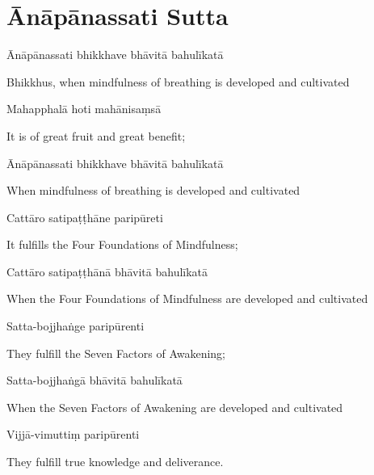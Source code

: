 \section{Ānāpānassati Sutta}


\begin{leader}
\end{leader}

Ānāpānassati bhikkhave bhāvitā bahulīkatā

\begin{english}
  Bhikkhus, when mindfulness of breathing is developed and cultivated
\end{english}

Mahapphalā hoti mahānisaṃsā

\begin{english}
  It is of great fruit and great benefit;
\end{english}

Ānāpānassati bhikkhave bhāvitā bahulīkatā

\begin{english}
  When mindfulness of breathing is developed and cultivated
\end{english}

Cattāro satipaṭṭhāne paripūreti

\begin{english}
  It fulfills the Four Foundations of Mindfulness;
\end{english}

Cattāro satipaṭṭhānā bhāvitā bahulīkatā

\begin{english}
  When the Four Foundations of Mindfulness are developed and cultivated
\end{english}

Satta-bojjhaṅge paripūrenti

\begin{english}
  They fulfill the Seven Factors of Awakening;
\end{english}

Satta-bojjhaṅgā bhāvitā bahulīkatā

\begin{english}
  When the Seven Factors of Awakening are developed and cultivated
\end{english}

Vijjā-vimuttiṃ paripūrenti

\begin{english}
  They fulfill true knowledge and deliverance.
\end{english}

